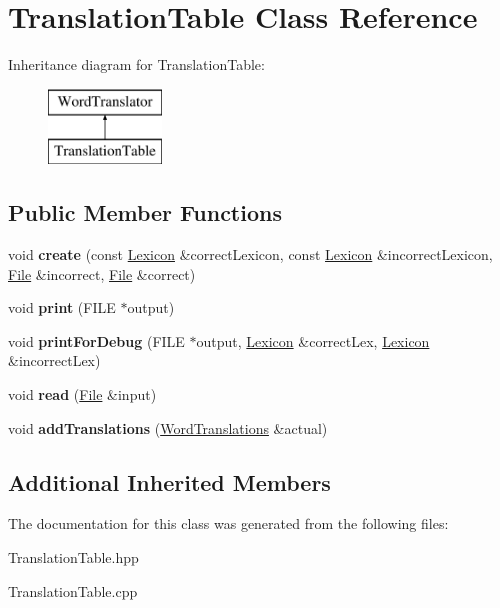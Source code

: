 \hypertarget{classTranslationTable}{}\section{Translation\+Table Class Reference}
\label{classTranslationTable}
Inheritance diagram for Translation\+Table\+:\begin{figure}[H]
\begin{center}
\leavevmode
\includegraphics[height=2.000000cm]{classTranslationTable}
\end{center}
\end{figure}
\subsection*{Public Member Functions}
\begin{DoxyCompactItemize}
\item 
\mbox{\label{classTranslationTable_a194a18a3efa0ad776e99e73c6a385bca}} 
void {\bfseries create} (const \hyperlink{classLexicon}{Lexicon} \&correct\+Lexicon, const \hyperlink{classLexicon}{Lexicon} \&incorrect\+Lexicon, \hyperlink{classFile}{File} \&incorrect, \hyperlink{classFile}{File} \&correct)
\item 
\mbox{\label{classTranslationTable_a1d06855e760f3d39c57a188b0059e99a}} 
void {\bfseries print} (F\+I\+LE $\ast$output)
\item 
\mbox{\label{classTranslationTable_ae8e6848bfd3221e1ba0c9cada67222c6}} 
void {\bfseries print\+For\+Debug} (F\+I\+LE $\ast$output, \hyperlink{classLexicon}{Lexicon} \&correct\+Lex, \hyperlink{classLexicon}{Lexicon} \&incorrect\+Lex)
\item 
\mbox{\label{classTranslationTable_a0856b27e0567627e2fc625dbc92a2d7a}} 
void {\bfseries read} (\hyperlink{classFile}{File} \&input)
\item 
\mbox{\label{classTranslationTable_aa16adfec6d2f059c26460e824d33ed9f}} 
void {\bfseries add\+Translations} (\hyperlink{classWordTranslations}{Word\+Translations} \&actual)
\end{DoxyCompactItemize}
\subsection*{Additional Inherited Members}


The documentation for this class was generated from the following files\+:\begin{DoxyCompactItemize}
\item 
Translation\+Table.\+hpp\item 
Translation\+Table.\+cpp\end{DoxyCompactItemize}
